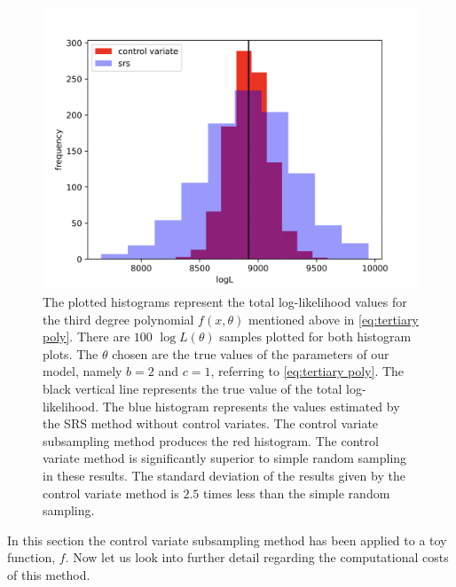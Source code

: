 \begin{figure} 
\centering    
\includegraphics[width=1.0\textwidth]{Chapter3/Figs/regen3_29.png}
\caption{ The plotted histograms represent the total log-likelihood values for the third degree polynomial $f(x,\theta)$ mentioned above in \cref{eq:tertiary poly}. There are $100$ $\log L(\theta)$ samples plotted for both histogram plots. The $\theta$ chosen are the true values of the parameters of our model, namely $b=2$ and $c=1$, referring to \cref{eq:tertiary poly}. The black vertical line represents the true value of the total log-likelihood. The blue histogram represents the values estimated by the SRS method without control variates. The control variate subsampling method produces the red histogram. The control variate method is significantly superior to simple random sampling in these results. The standard deviation of the results given by the control variate method is $2.5$ times less than the simple random sampling.}
\label{fig:gggh}
\end{figure}

In this section the control variate subsampling method has been applied to a toy function, $f$. Now let us look into further detail regarding the computational costs of this method.


